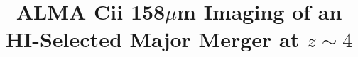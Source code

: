 \documentclass[twocolumn]{aastex62}
\begin{document}

\title{ALMA C{\sc ii} 158$\mu$m Imaging of an HI-Selected Major Merger at $z \sim 4$}


\end{document}

